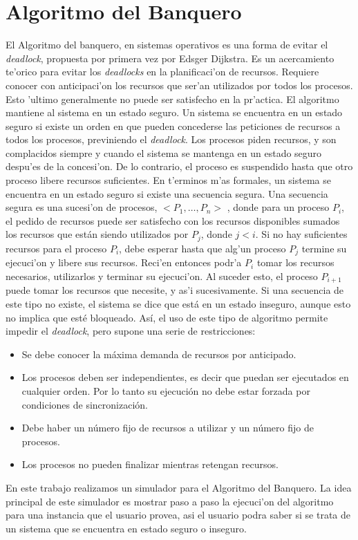 \section{Algoritmo del Banquero}
El Algoritmo del banquero, en sistemas operativos es una forma de evitar el
\emph{deadlock}, propuesta por primera vez por Edsger Dijkstra. Es un
acercamiento te'orico para evitar los \emph{deadlocks} en la planificaci'on de
recursos. Requiere conocer con anticipaci'on los recursos que ser'an utilizados
por todos los procesos. Esto 'ultimo generalmente no puede ser satisfecho en la
pr'actica.
El algoritmo mantiene al sistema en un estado seguro. Un sistema se encuentra
en un estado seguro si existe un orden en que pueden concederse las peticiones
de recursos a todos los procesos, previniendo el \emph{deadlock}.
Los procesos piden recursos, y son complacidos siempre y cuando el sistema se
mantenga en un estado seguro despu'es de la concesi'on. De lo contrario, el
proceso es suspendido hasta que otro proceso libere recursos suficientes.
En t'erminos m'as formales, un sistema se encuentra en un estado seguro si
existe una secuencia segura. Una secuencia segura es una sucesi'on de procesos,
$< P_1,\ldots, P_n >$ , donde para un proceso $P_i$, el pedido de recursos
puede ser satisfecho con los recursos disponibles sumados los recursos que
están siendo utilizados por $P_j$, donde $j < i$. Si no hay suficientes
recursos para el proceso $P_i$, debe esperar hasta que alg'un proceso $P_j$
termine su ejecuci'on y libere sus recursos. Reci'en entonces podr'a $P_i$
tomar los recursos necesarios, utilizarlos y terminar su ejecuci'on. Al suceder
esto, el proceso $P_{i+1}$ puede tomar los recursos que necesite, y as'i
sucesivamente. Si una secuencia de este tipo no existe, el sistema se dice que
está en un estado inseguro, aunque esto no implica que esté bloqueado.
Así, el uso de este tipo de algoritmo permite impedir el \emph{deadlock}, pero
supone una serie de restricciones:
\begin{itemize}
 \item Se debe conocer la máxima demanda de recursos por anticipado.
 \item Los procesos deben ser independientes, es decir que puedan ser
ejecutados en cualquier orden. Por lo tanto su ejecución no debe estar forzada
por condiciones de sincronización.
 \item Debe haber un número fijo de recursos a utilizar y un número fijo de
procesos.
 \item Los procesos no pueden finalizar mientras retengan recursos.
\end{itemize}
En este trabajo realizamos un simulador para el Algoritmo del Banquero. La idea
principal de este simulador es mostrar paso a paso la ejecuci'on del algoritmo
para una instancia que el usuario provea, asi el usuario podra saber si se
trata de un sistema que se encuentra en estado seguro o inseguro.
